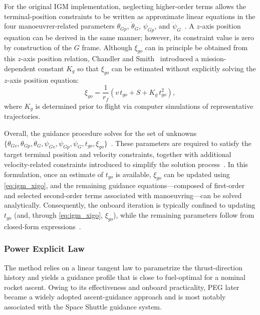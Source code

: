 For the original IGM implementation, neglecting higher-order terms allows the terminal-position constraints to be written as approximate linear equations in the four manoeuvrer-related parameters
$\theta_{Gp}$, $\dot{\theta}_G$, $\psi_{Gp}$, and $\dot{\psi}_G$~\cite{SONG2015463}.
A $z$-axis position equation can be derived in the same manner; however, its constraint value is zero by construction of the $G$ frame. Although $\xi_{go}$ can in principle be obtained from this $z$-axis position relation, Chandler and Smith~\cite{ChandlerSmith1967IterativeGuidanceMode} introduced a mission-dependent constant $K_g$ so that $\xi_{go}$ can be estimated without explicitly solving the $z$-axis position equation:
\begin{equation}
\xi_{go}=\frac{1}{r_f}\left(v\,t_{go}+S+K_g\,t_{go}^2\right),
\label{eq:igm_xigo}
\end{equation}
where $K_g$ is determined prior to flight via computer simulations of representative trajectories.

Overall, the guidance procedure solves for the set of unknowns
$\{\theta_{Gv},\theta_{Gp},\dot{\theta}_G,\psi_{Gv},\psi_{Gp},\dot{\psi}_G,t_{go},\xi_{go}\}$~\cite{SONG2015463}.
These parameters are required to satisfy the target terminal position and velocity constraints, together with additional velocity-related constraints introduced to simplify the solution process~\cite{ChandlerSmith1967IterativeGuidanceMode}. In this formulation, once an estimate of $t_{go}$ is available, $\xi_{go}$ can be updated using \eqref{eq:igm_xigo}, and the remaining guidance equations—composed of first-order and selected second-order terms associated with manoeuvring—can be solved analytically. Consequently, the onboard iteration is typically confined to updating $t_{go}$ (and, through \eqref{eq:igm_xigo}, $\xi_{go}$), while the remaining parameters follow from closed-form expressions~\cite{SONG2015463}.



\subsubsection{Power Explicit Law}

The method relies on a linear tangent law to parametrize the thrust-direction history and yields a guidance profile that is close to fuel-optimal for a nominal rocket ascent. Owing to its effectiveness and onboard practicality, PEG later became a widely adopted ascent-guidance approach and is most notably associated with the Space Shuttle guidance system.

